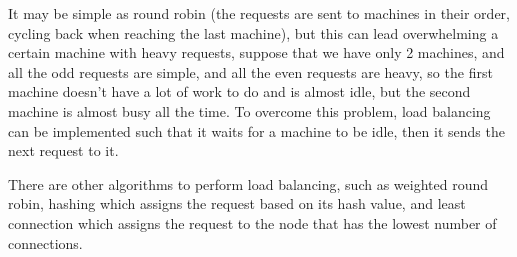 It may be simple as round robin (the requests are sent to machines in their order, cycling back when reaching the last machine), but this can lead overwhelming a certain machine with heavy requests, suppose that we have only 2 machines, and all the odd requests are simple, and all the even requests are heavy, so the first machine doesn't have a lot of work to do and is almost idle, but the second machine is almost busy all the time. 
To overcome this problem, load balancing can be implemented such that it waits for a machine to be idle, then it sends the next request to it.

There are other algorithms to perform load balancing, such as weighted round robin, hashing which assigns the request based on its hash value, and least connection which assigns the request to the node that has the lowest number of connections.

\newpage
